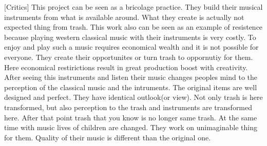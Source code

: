 [Critics] This project can be seen as a bricolage practice. They build their musical instruments from what is available around. What they create is actually not expected thing from trash. This work also can be seen as an example of resistence because playing western classical music with their instruments is very costly. To enjoy and play such a music requires economical wealth and it is not possible for everyone. They create their opportunites or turn trash to oppornutiy for them. Here economical restirictions result in great production boost with creativity. After seeing this instruments and listen their music changes peoples mind to the perception of the classical music and the intruments. The original items are well designed and perfect. They have identical outlook(or view). Not only trash is here transformed, but also perception to the trash and instruments are transformed here. After that point trash that you know is no longer same trash. At the same time with music lives of children are changed. They work on unimaginable thing for them. Quality of their music is different than the original one. 



